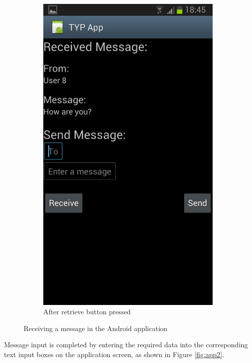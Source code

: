 \documentclass[a4paper,12pt]{report}
\begin{document}
\begin{figure}
\begin{subfigure}[b]{0.45\textwidth}
                \includegraphics[scale=0.2]{images/screenshots/app1b.jpg}
                \caption{After retrieve button pressed}
                \label{fig:app1b}
        \end{subfigure}
        \caption{Receiving a message in the Android application}\label{fig:recapp}
\end{figure}

Message input is completed by entering the required data into the corresponding text input boxes on the application screen, as shown in Figure \ref{fig:app2}.
\end{document}
